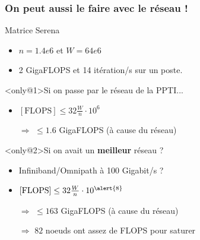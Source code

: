 \documentclass[xcolor={x11names,svgnames}, 14pt]{beamer}
\begin{document}
\begin{frame}
  \frametitle{On peut aussi le faire avec le réseau !}
  
  \begin{block}{Matrice \og Serena\fg{}}
    \begin{itemize}
    \item $n = 1.4e6$ et $W = 64e6$
    \item 2 GigaFLOPS et 14 itération/s sur un poste.
    \end{itemize}
  \end{block}

  \begin{overlayarea}{\textwidth}{5cm}
  \begin{alertblock}<only@1>{Si on passe par le réseau de la PPTI...}
    \begin{itemize}
    \item $[\text{FLOPS}] \leq 32 \frac{W}{n} \cdot 10^6 $
    \item[$\Rightarrow$] $\leq 1.6$ GigaFLOPS (à cause du réseau)
    \end{itemize}
  \end{alertblock}

  \begin{exampleblock}<only@2>{Si on avait un \textbf{meilleur} réseau ?}
    \begin{itemize}
    \item Infiniband/Omnipath à 100 Gigabit/s ?
    \item $[\text{FLOPS}] \leq 32 \frac{W}{n} \cdot 10^{\alert{8}}$
    \item[$\Rightarrow$] $\leq 163$ GigaFLOPS (à cause du réseau)
    \item[$\Rightarrow$] $82$ noeuds ont assez de FLOPS pour saturer
    \end{itemize}
  \end{exampleblock}
\end{overlayarea}
\end{frame}


\end{document}

